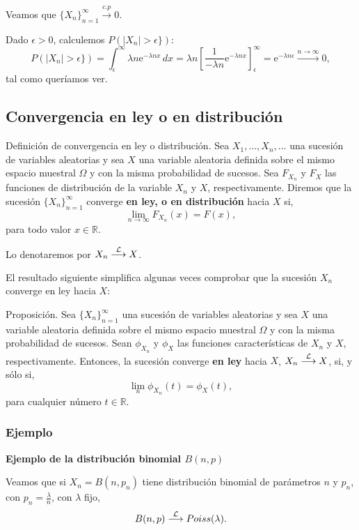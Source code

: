 \documentclass[]{book}
\begin{document}
Veamos que \(\{X_n\}_{n=1}^\infty\stackrel{c.p}{\longrightarrow} 0\).

Dado \(\epsilon >0\), calculemos \(P(|X_n|>\epsilon \})\):
\[
P(|X_n|>\epsilon \}) = \int_\epsilon^\infty \lambda n\mathrm{e}^{-\lambda n x}\, dx =\lambda n \left[\frac{1}{-\lambda n}\mathrm{e}^{-\lambda n x}\right]_\epsilon^\infty =\mathrm{e}^{-\lambda n \epsilon}\stackrel{n\to\infty}{\longrightarrow} 0,
\]
tal como queríamos ver.

\hypertarget{convergencia-en-ley-o-en-distribuciuxf3n}{%
\subsection{Convergencia en ley o en distribución}\label{convergencia-en-ley-o-en-distribuciuxf3n}}

 Definición de convergencia en ley o distribución.
Sea \(X_1,\ldots,X_n,\ldots\) una sucesión de variables aleatorias y sea \(X\) una variable aleatoria definida sobre el mismo espacio muestral \(\Omega\) y con la misma probabilidad de sucesos. Sea \(F_{X_n}\) y \(F_X\) las funciones de distribución de la variable \(X_n\) y \(X\), respectivamente. Diremos que la sucesión \(\{X_n\}_{n=1}^\infty\) converge \textbf{en ley, o en distribución} hacia \(X\) si,
\[
\lim_{n\to\infty} F_{X_n}(x)=F(x),
\]
para todo valor \(x\in\mathbb{R}\).

Lo denotaremos por \(X_n\stackrel{{\cal L}}{\longrightarrow}X\).

El resultado siguiente simplifica algunas veces comprobar que la sucesión \(X_n\) converge en ley hacia \(X\):

 Proposición.
Sea \(\{X_n\}_{n=1}^\infty\) una sucesión de variables aleatorias y sea \(X\) una variable aleatoria definida sobre el mismo espacio muestral \(\Omega\) y con la misma probabilidad de sucesos. Sean \(\phi_{X_n}\) y \(\phi_X\) las funciones características de \(X_n\) y \(X\), respectivamente. Entonces, la sucesión converge \textbf{en ley} hacia \(X\), \(X_n\stackrel{{\cal L}}{\longrightarrow}X\), si, y sólo si,
\[
\lim_{n} \phi_{X_n}(t) = \phi_X(t),
\]
para cualquier número \(t\in\mathbb{R}\).

\hypertarget{ejemplo-5}{%
\subsubsection{Ejemplo}\label{ejemplo-5}}

\textbf{Ejemplo de la distribución binomial \(B(n,p)\)}

Veamos que si \(X_n=B(n,p_n)\) tiene distribución binomial de parámetros \(n\) y \(p_n\), con \(p_n=\frac{\lambda}{n}\), con \(\lambda\) fijo,
\[
B(n,p)\stackrel{{\cal L}}{\longrightarrow}Poiss(\lambda).
\]
\end{document}

